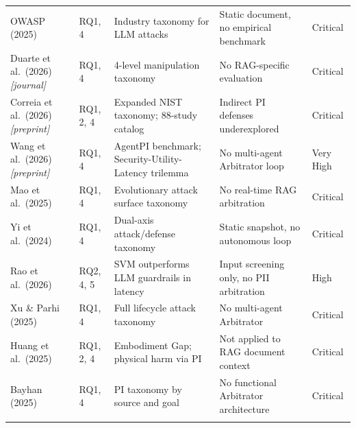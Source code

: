 \documentclass[12pt, a4paper]{report}
\begin{document}
\begin{small}
\begin{longtable}{L{3cm} C{1.2cm} L{3.5cm} L{3.5cm} C{1.5cm}}
OWASP (2025) & RQ1, 4 & Industry taxonomy for LLM attacks & Static document, no empirical benchmark & Critical \\
Duarte et al.\ (2026) \emph{[journal]} & RQ1, 4 & 4-level manipulation taxonomy & No RAG-specific evaluation & Critical \\
Correia et al.\ (2026) \emph{[preprint]} & RQ1, 2, 4 & Expanded NIST taxonomy; 88-study catalog & Indirect PI defenses underexplored & Critical \\
Wang et al.\ (2026) \emph{[preprint]} & RQ1, 4 & AgentPI benchmark; Security-Utility-Latency trilemma & No multi-agent Arbitrator loop & Very High \\
Mao et al.\ (2025) & RQ1, 4 & Evolutionary attack surface taxonomy & No real-time RAG arbitration & Critical \\
Yi et al.\ (2024) & RQ1, 4 & Dual-axis attack/defense taxonomy & Static snapshot, no autonomous loop & Critical \\
Rao et al.\ (2026) & RQ2, 4, 5 & SVM outperforms LLM guardrails in latency & Input screening only, no PII arbitration & High \\
Xu \& Parhi (2025) & RQ1, 4 & Full lifecycle attack taxonomy & No multi-agent Arbitrator & Critical \\
Huang et al.\ (2025) & RQ1, 2, 4 & Embodiment Gap; physical harm via PI & Not applied to RAG document context & Critical \\
Bayhan (2025) & RQ1, 4 & PI taxonomy by source and goal & No functional Arbitrator architecture & Critical \\

\midrule
{}
 \\
\midrule


\end{longtable}
\end{small}
\end{document}
